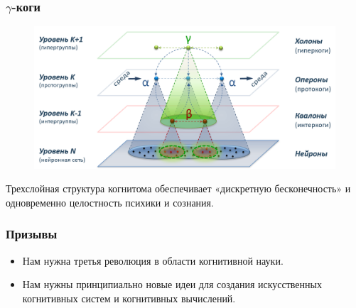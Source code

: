 \documentclass[default]{beamer}
\begin{document}
	\begin{frame}	
		\frametitle{$\gamma$-коги}

		\begin{figure}
			\includegraphics[width=\textwidth]{gamma-cog}
		\end{figure}
		
		Трехслойная структура когнитома обеспечивает «дискретную бесконечность» и одновременно целостность психики и сознания.
		
	\end{frame}		
	
	\begin{frame}	
		\frametitle{Призывы}
		
		\begin{itemize}
			\item Нам нужна третья революция в области когнитивной науки.
			\item Нам нужны принципиально новые идеи для создания искусственных когнитивных систем и когнитивных вычислений.
		\end{itemize}
		
	\end{frame}	
												
%		
%				
	
\end{document}
